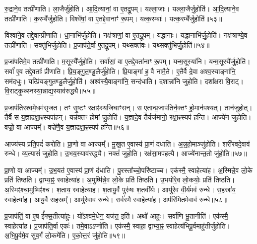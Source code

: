 रु॒द्राने॒व तत्प्री॑णाति।
ला॒जैर्जु॑होति।
आ॒दि॒त्यानां॒ वा ए॒तद्रू॒पम्।
यल्ला॒जाः।
यल्ला॒जैर्जु॒होति॑।
आ॒दि॒त्याने॒व तत्प्री॑णाति।
क॒रम्बै᳚र्जुहोति।
विश्वे॑षां॒ वा ए॒तद्दे॒वानाꣳ॑ रू॒पम्।
यत्क॒रम्बाः᳚।
यत्क॒रम्बै᳚र्जु॒होति॑॥५३॥\ip

विश्वा॑ने॒व तद्दे॒वान्प्री॑णाति।
धा॒नाभि॑र्जुहोति।
नक्ष॑त्राणां॒ वा ए॒तद्रू॒पम्।
यद्धा॒नाः।
यद्धा॒नाभि॑र्जु॒होति॑।
नक्ष॑त्राण्ये॒व तत्प्री॑णाति।
सक्तु॑भिर्जुहोति।
प्र॒जा\-प॑ते॒र्वा ए॒तद्रू॒पम्।
यथ्सक्त॑वः।
यथ्सक्तु॑भिर्जु॒होति॑॥५४॥\ip

प्र॒जा॑पतिमे॒व तत्प्री॑णाति।
म॒सूस्यै᳚र्जुहोति।
सर्वा॑सां॒ वा ए॒तद्दे॒वता॑नाꣳ रू॒पम्।
यन्म॒सूस्या॑नि।
यन्म॒सूस्यै᳚र्जु॒होति॑।
सर्वा॑ ए॒व तद्दे॒वताः᳚ प्रीणाति।
प्रि॒य॒ङ्गु॒त॒ण्डु॒लैर्जु॑होति।
प्रि॒याङ्गा॑ ह॒ वै नामै॒ते।
ए॒तैर्वै दे॒वा अश्व॒स्याङ्गा॑नि॒ सम॑दधुः।
यत्प्रि॑यङ्गुतण्डु॒लैर्जु॒होति॑।
अश्व॑स्यै॒वाङ्गा॑नि॒ सन्द॑धाति।
दशान्ना॑नि जुहोति।
दशा᳚क्षरा वि॒राट्।
वि॒राट्कृ॒थ्स्नस्या॒न्नाद्य॒स्या\-व॑\-रुद्ध्यै॥५५॥\ip\anuvakamend[जु॒होति॒ मधु॑ना जु॒होति॒ पृथु॑कैर्जु॒होति॑ क॒रम्बै᳚र्जु॒होति॒ सक्तु॑भिर्जु॒होति॑ प्रियङ्गुतण्डु॒लैर्जु॒होति॑ च॒त्वारि॑ च (अ॒न्नहो॒मानाऽऽज्ये॑ना॒ग्नेर्मधु॑ना तण़्डु॒लैः पृथु॑कैर्ला॒जैः क॒रम्बै᳚र्धा॒नाभिः॒ सक्तु॑भिर्म॒सूस्यैः᳚ प्रियङ्गुतण्डु॒लैर्द॒शान्ना॑नि॒ द्वाद॑श।)]

प्र॒जा\-प॑तिरश्वमे॒धम॑\-सृजत।
तꣳ सृ॒ष्टꣳ रक्षाꣴ॑स्यजिघाꣳसन्।
स ए॒तान्प्र॒जा\-प॑तिर्न॒क्तꣳ हो॒मान॑पश्यत्।
तान॑जुहोत्।
तैर्वै स य॒ज्ञाद्रक्षा॒ꣴ॒स्यपा॑हन्।
यन्न॑क्तꣳ हो॒मां जु॒होति॑।
य॒ज्ञादे॒व तैर्यज॑मानो॒ रक्षा॒ꣴ॒स्यप॑ हन्ति।
आज्ये॑न जुहोति।
वज्रो॒ वा आज्यम्᳚।
वज्रे॑णै॒व य॒ज्ञाद्रक्षा॒ꣴ॒स्यप॑ हन्ति॥५६॥\ip

आज्य॑स्य प्रति॒पदं॑ करोति।
प्रा॒णो वा आज्यम्᳚।
मु॒ख॒त ए॒वास्य॑ प्रा॒णं द॑धाति।
अ॒न्न॒हो॒माञ्जु॑होति।
शरी॑रवदे॒वाव॑ रुन्धे।
व्य॒त्यासं॑ जुहोति।
उ॒भय॒स्या\-व॑\-रुद्ध्यै।
नक्तं॑ जुहोति।
रक्ष॑सा॒मप॑हत्यै।
आज्ये॑नान्त॒तो जु॑होति॥५७॥\ip

प्रा॒णो वा आज्यम्᳚।
उ॒भ॒यत॑ ए॒वास्य॑ प्रा॒णं द॑धाति।
पु॒रस्ता᳚च्चो॒परि॑ष्टाच्च।
एक॑स्मै॒ स्वाहेत्या॑ह।
अ॒स्मिन्ने॒व लो॒के प्रति॑ तिष्ठति।
द्वाभ्या॒ꣴ॒ स्वाहेत्या॑ह।
अ॒मुष्मि॑न्ने॒व लो॒के प्रति॑ तिष्ठति।
उ॒भयो॑रे॒व लो॒कयोः॒ प्रति॑ तिष्ठति।
अ॒स्मिꣴश्चा॒मुष्मिꣴ॑श्च।
श॒ताय॒ स्वाहेत्या॑ह।
श॒तायु॒र्वै पुरु॑षः श॒तवी᳚र्यः।
आयु॑रे॒व वी॒र्य॑मव॑ रुन्धे।
स॒हस्रा॑य॒ स्वाहेत्या॑ह।
आयु॒र्वै स॒हस्रम्᳚।
आयु॑रे॒वाव॑ रुन्धे।
सर्व॑स्मै॒ स्वाहेत्या॑ह।
अप॑रिमितमे॒वाव॑ रुन्धे॥५८॥\ip\anuvakamend[ए॒व य॒ज्ञाद्रक्षा॒ꣴ॒स्यप॑हन्त्यन्त॒तो जु॑होति श॒ताय॒ स्वाहेत्या॑ह स॒प्त च॑]

प्र॒जा\-प॑तिं॒ वा ए॒ष ई᳚फ्स॒तीत्या॑हुः।
यो᳚ऽश्वमे॒धेन॒ यज॑त॒ इति॑।
अथो॑ आहुः।
सर्वा॑णि भू॒तानीति॑।
एक॑स्मै॒ स्वाहेत्या॑ह।
प्र॒जा\-प॑ति॒र्वा एकः॑।
तमे॒वाऽऽप्नो॑ति।
एक॑स्मै॒ स्वाहा॒ द्वाभ्या॒ꣴ॒ स्वाहेत्य॑भिपू॒र्वमाहु॑तीर्जुहोति।
अ॒भि॒पू॒र्वमे॒व सु॑व॒र्गं लो॒कमे॑ति।
ए॒को॒त्त॒रं जु॑होति॥५९॥\ip


